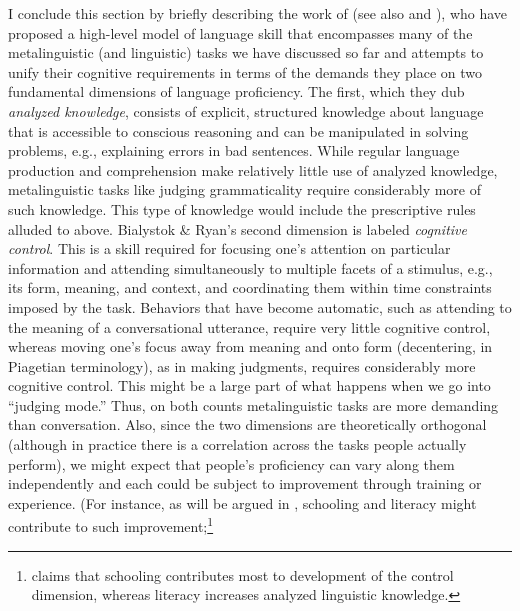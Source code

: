I conclude this section by briefly describing the work of \citet{BialystokEtAl1985} (see also \citealt{RyanEtAl1984} and \citealt{Bialystok1986}), 
who have proposed a high-level model of language skill that encompasses many of the metalinguistic (and linguistic) tasks we have discussed so far and attempts to unify their cognitive requirements in terms of the demands they place on two fundamental dimensions of language proficiency. The first, which they dub \textit{analyzed knowledge}, consists of explicit, structured knowledge about language that is accessible to conscious reasoning and can be manipulated in solving problems, e.g., explaining errors in bad sentences. While regular language production and comprehension
make relatively little use of analyzed knowledge, metalinguistic tasks like judging grammaticality require considerably more of such knowledge. This type of knowledge would include the prescriptive rules alluded to above. Bialystok \& Ryan's second dimension is labeled \textit{cognitive control}. This is a skill required for focusing one's attention on particular information and attending simultaneously to multiple facets of a stimulus, e.g., its form, meaning, and context, and coordinating them within time constraints imposed by the task. Behaviors that have become automatic, such as attending to the meaning of a conversational utterance, require very little cognitive control, whereas moving one's focus away from meaning and onto form (decentering, in Piagetian terminology), as in making judgments, requires considerably more cognitive control. This might be a large part of what happens when we go into ``judging mode.'' Thus, on both counts metalinguistic tasks are more demanding than conversation. Also, since the two dimensions are theoretically orthogonal (although in practice there is a correlation across the tasks people actually perform), we might expect that people's proficiency can vary along them independently and each could be subject to improvement through training or experience. (For instance, as will be argued in , schooling and literacy might contribute to such improvement;\footnote{\citet{Bialystok1986} claims that schooling contributes most to development of the control dimension, whereas literacy increases analyzed linguistic knowledge.
}
